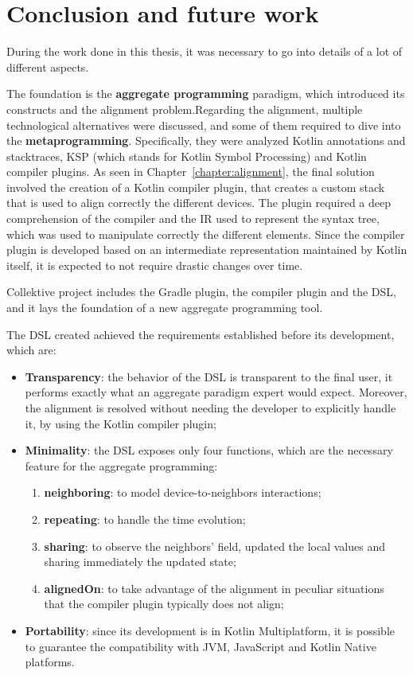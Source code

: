 \chapter{Conclusion and future work}\label{chapter:conclusion}
During the work done in this thesis, it was necessary to go into details of a lot of different aspects.

The foundation is the \textbf{aggregate programming} paradigm, which introduced its constructs and the alignment problem.\newline Regarding the alignment, multiple technological alternatives were discussed, and some of them required to dive into the \textbf{metaprogramming}. Specifically, they were analyzed Kotlin annotations and stacktraces, KSP (which stands for Kotlin Symbol Processing) and Kotlin compiler plugins.\newline
As seen in Chapter~\ref{chapter:alignment}, the final solution involved the creation of a Kotlin compiler plugin, that creates a custom stack that is used to align correctly the different devices. The plugin required a deep comprehension of the compiler and the IR used to represent the syntax tree, which was used to manipulate correctly the different elements.\newline
Since the compiler plugin is developed based on an intermediate representation maintained by Kotlin itself, it is expected to not require drastic changes over time.

Collektive project includes the Gradle plugin, the compiler plugin and the DSL, and it lays the foundation of a new aggregate programming tool.

The DSL created achieved the requirements established before its development, which are:
\begin{itemize}
    \item \textbf{Transparency}: the behavior of the DSL is transparent to the final user, it performs exactly what an aggregate paradigm expert would expect. Moreover, the alignment is resolved without needing the developer to explicitly handle it, by using the Kotlin compiler plugin;
    \item \textbf{Minimality}: the DSL exposes only four functions, which are the necessary feature for the aggregate programming:
    \begin{enumerate}
        \item \textbf{neighboring}: to model device-to-neighbors interactions;
        \item \textbf{repeating}: to handle the time evolution;
        \item \textbf{sharing}: to observe the neighbors' field, updated the local values and sharing immediately the updated state;
        \item \textbf{alignedOn}: to take advantage of the alignment in peculiar situations that the compiler plugin typically does not align;
    \end{enumerate}
    \item \textbf{Portability}: since its development is in Kotlin Multiplatform, it is possible to guarantee the compatibility with JVM, JavaScript and Kotlin Native platforms.
\end{itemize}

